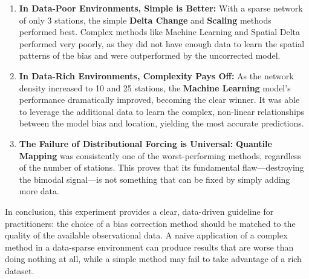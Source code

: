 \documentclass[11pt, a4paper]{article}
\begin{document}
\begin{enumerate}
    \item \textbf{In Data-Poor Environments, Simple is Better:} With a sparse network of only 3 stations, the simple \textbf{Delta Change} and \textbf{Scaling} methods performed best. Complex methods like Machine Learning and Spatial Delta performed very poorly, as they did not have enough data to learn the spatial patterns of the bias and were outperformed by the uncorrected model.
    \item \textbf{In Data-Rich Environments, Complexity Pays Off:} As the network density increased to 10 and 25 stations, the \textbf{Machine Learning} model's performance dramatically improved, becoming the clear winner. It was able to leverage the additional data to learn the complex, non-linear relationships between the model bias and location, yielding the most accurate predictions.
    \item \textbf{The Failure of Distributional Forcing is Universal:} \textbf{Quantile Mapping} was consistently one of the worst-performing methods, regardless of the number of stations. This proves that its fundamental flaw—destroying the bimodal signal—is not something that can be fixed by simply adding more data.
\end{enumerate}

In conclusion, this experiment provides a clear, data-driven guideline for practitioners: the choice of a bias correction method should be matched to the quality of the available observational data. A naive application of a complex method in a data-sparse environment can produce results that are worse than doing nothing at all, while a simple method may fail to take advantage of a rich dataset.
\end{document}
